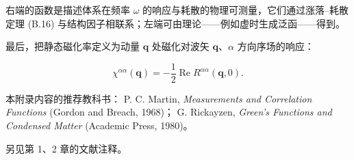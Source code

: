 右端的函数是描述体系在频率 $\omega$ 的响应与耗散的物理可测量，它们通过涨落--耗散定理 (B.16) 与结构因子相联系；左端可由理论——例如虚时生成泛函——得到。

最后，把静态磁化率定义为动量 $\mathbf{q}$ 处磁化对波矢 $\mathbf{q}$、$\alpha$ 方向序场的响应：

\begin{equation*}
\chi^ {\alpha \alpha} ( \mathbf {q} ) = - \frac {1}{2} \operatorname{Re} R ^ {\alpha \alpha} ( \mathbf {q}, 0 ).
\tag{B.27}
\end{equation*}

\begin{chapbib}
\item 本附录内容的推荐教科书：
  P. C. Martin, \textit{Measurements and Correlation Functions} (Gordon and Breach, 1968)；
  G. Rickayzen, \textit{Green's Functions and Condensed Matter} (Academic Press, 1980)。
\item 另见第 1、2 章的文献注释。
\end{chapbib}
